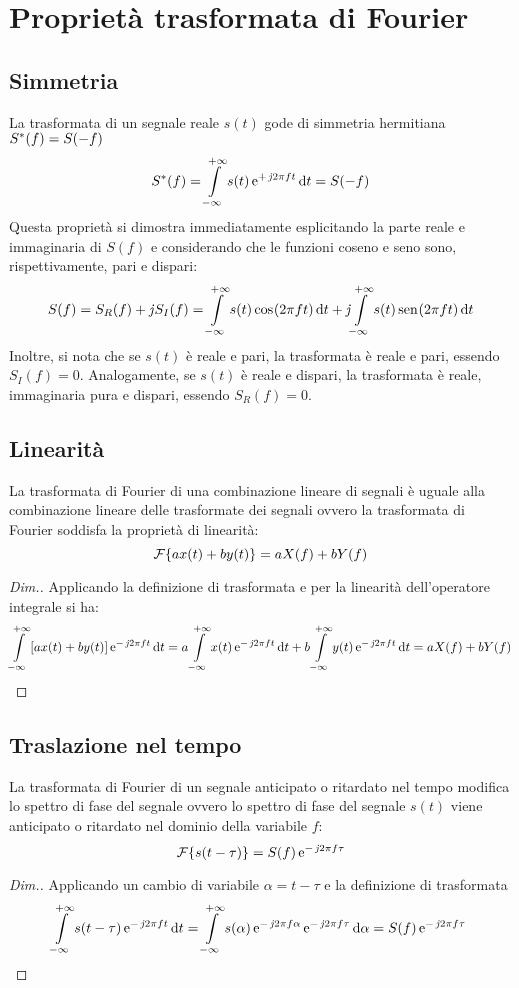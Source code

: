 \section{Proprietà trasformata di Fourier}
\subsection{Simmetria}
La trasformata di un segnale reale $s(t)$ gode di simmetria hermitiana ${S}^\ast(f)=S(-f)$
\begin{equation}
	{S}^\ast(f)=\int\limits_{-\infty}^{+\infty}{s(t)\operatorname{e}^{+\operatorname{\mathit{j}\!} 2\pi f t}}{\,\mathop{}\!\mathrm{d}{t}}=S(-f)
\end{equation}
Questa proprietà si dimostra immediatamente esplicitando la parte reale e immaginaria di $S(f)$ e considerando che le funzioni coseno e seno sono, rispettivamente, pari e dispari:
\[
	S(f)=S_R(f)+\operatorname{\mathit{j}\!} S_I(f)=\int\limits_{-\infty}^{+\infty}{s(t)\,{\operatorname{cos}}^{}\!\left({2\pi f t}\right)}{\,\mathop{}\!\mathrm{d}{t}}+\operatorname{\mathit{j}\!}\int\limits_{-\infty}^{+\infty}{s(t)\,{\operatorname{sen}}^{}\!\left({2\pi f t}\right)}{\,\mathop{}\!\mathrm{d}{t}}
\]
Inoltre, si nota che se $s(t)$ è reale e pari, la trasformata è reale e pari, essendo $S_I(f)=0$.
Analogamente, se $s(t)$ è reale e dispari, la trasformata è reale, immaginaria pura e dispari, essendo $S_R(f)=0$.

\subsection{Linearità}
La trasformata di Fourier di una combinazione lineare di segnali è uguale alla combinazione lineare delle trasformate dei segnali ovvero la trasformata di Fourier soddisfa la proprietà di linearità:
\begin{equation}
	\operatorname{\mathcal{F}}\!\left\lbrace{a x(t)+b y(t)}\right\rbrace= a X(f)+b Y(f)
\end{equation}

\begin{proof}[Dim.]
Applicando la definizione di trasformata e per la linearità dell'operatore integrale si ha:
\[
	 \int\limits_{-\infty}^{+\infty}{\left[a x(t)+b y(t)\right]\operatorname{e}^{-\operatorname{\mathit{j}\!} 2\pi f t}}{\,\mathop{}\!\mathrm{d}{t}}= a\int\limits_{-\infty}^{+\infty}{x(t)\operatorname{e}^{-\operatorname{\mathit{j}\!} 2\pi f t}}{\,\mathop{}\!\mathrm{d}{t}}+b\int\limits_{-\infty}^{+\infty}{y(t)\operatorname{e}^{-\operatorname{\mathit{j}\!} 2\pi f t}}{\,\mathop{}\!\mathrm{d}{t}}=a X(f)+b Y(f)
\qedhere
\]
\end{proof}

\subsection{Traslazione nel tempo}
La trasformata di Fourier di un segnale anticipato o ritardato nel tempo modifica lo spettro di fase del segnale ovvero lo spettro di fase del segnale $s(t)$ viene anticipato o ritardato nel dominio della variabile $f$:
\begin{equation}
\label{eq:trasf_Fourier_trasl}
	\operatorname{\mathcal{F}}\!\left\lbrace{s(t-\tau)}\right\rbrace= S(f)\operatorname{e}^{-\operatorname{\mathit{j}\!} 2\pi f \tau}
\end{equation}
\begin{proof}[Dim.]
Applicando un cambio di variabile $\alpha=t-\tau$ e la definizione di trasformata
\[
	\int\limits_{-\infty}^{+\infty}{s(t-\tau)\operatorname{e}^{-\operatorname{\mathit{j}\!} 2\pi f t}}{\,\mathop{}\!\mathrm{d}{t}}=
	\int\limits_{-\infty}^{+\infty}{s(\alpha)\operatorname{e}^{-\operatorname{\mathit{j}\!} 2\pi f\alpha}\operatorname{e}^{-\operatorname{\mathit{j}\!} 2\pi f\tau}}{\,\mathop{}\!\mathrm{d}{\alpha}}=S(f)\operatorname{e}^{-\operatorname{\mathit{j}\!} 2\pi f\tau}
\qedhere
\]
\end{proof}

